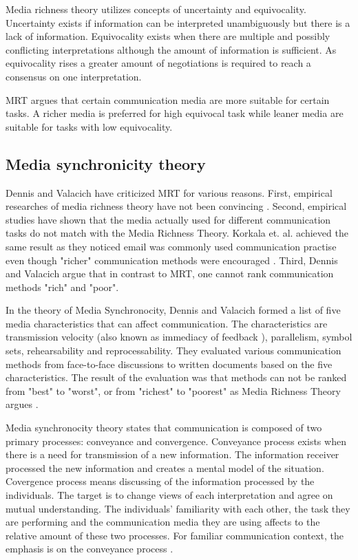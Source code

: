 \documentclass[conference]{IEEEtran}
\begin{document}
Media richness theory utilizes concepts of uncertainty and equivocality. Uncertainty exists if information can be interpreted unambiguously but there is a lack of information. Equivocality exists when there are multiple and possibly conflicting interpretations although the amount of information is sufficient. As equivocality rises a greater amount of negotiations is required to reach a consensus on one interpretation. \cite{1999dennis}

MRT argues that certain communication media are more suitable for certain tasks. A richer media is preferred for high equivocal task while leaner media are suitable for tasks with low equivocality. 

\subsection{Media synchronicity theory}

Dennis and Valacich have criticized MRT for various reasons. First, empirical researches of media richness theory have not been convincing \cite{1998dennis} \cite{1997elshinnawy}. Second, empirical studies have shown that the media actually used for different communication tasks do not match with the Media Richness Theory. Korkala et. al. achieved the same result as they noticed email was commonly used communication practise even though "richer" communication methods were encouraged \cite{2006korkala}. Third, Dennis and Valacich argue that in contrast to MRT, one cannot rank communication methods "rich" and "poor". \cite{1999dennis}

In the theory of Media Synchronocity, Dennis and Valacich formed a list of five media characteristics that can affect communication. The characteristics are transmission velocity (also known as immediacy of feedback \cite{1999dennis}), parallelism, symbol sets, rehearsability and reprocessability. They evaluated various communication methods from face-to-face discussions to written documents based on the five characteristics. The result of the evaluation was that methods can not be ranked from "best" to "worst", or from "richest" to "poorest" as Media Richness Theory argues \cite{2008dennis}. 

Media synchronocity theory states that communication is composed of two primary processes: conveyance and convergence. Conveyance process exists when there is a need for transmission of a new information. The information receiver processed the new information and creates a mental model of the situation. Covergence process means discussing of the information processed by the individuals. The target is to change views of each interpretation and agree on mutual understanding. The individuals' familiarity with each other, the task they are performing and the communication media they are using affects to the relative amount of these two processes. For familiar communication context, the emphasis is on the conveyance process \cite{2008dennis}.
\end{document}
